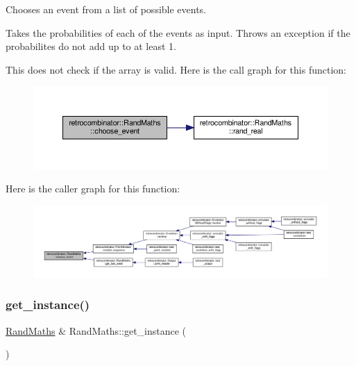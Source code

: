 Chooses an event from a list of possible events. 

Takes the probabilities of each of the events as input. Throws an exception if the probabilites do not add up to at least 1.

This does not check if the array is valid. Here is the call graph for this function\+:\nopagebreak
\begin{figure}[H]
\begin{center}
\leavevmode
\includegraphics[width=350pt]{classretrocombinator_1_1RandMaths_a3834f9a074546f0d588247610f16fb0e_cgraph}
\end{center}
\end{figure}
Here is the caller graph for this function\+:
\nopagebreak
\begin{figure}[H]
\begin{center}
\leavevmode
\includegraphics[width=350pt]{classretrocombinator_1_1RandMaths_a3834f9a074546f0d588247610f16fb0e_icgraph}
\end{center}
\end{figure}
\mbox{\label{classretrocombinator_1_1RandMaths_ae54dee1a16fb0e275e1624ccaa7dc87e}} 
\subsubsection{\texorpdfstring{get\+\_\+instance()}{get\_instance()}}
{\footnotesize\ttfamily \hyperlink{classretrocombinator_1_1RandMaths}{Rand\+Maths} \& Rand\+Maths\+::get\+\_\+instance (\begin{DoxyParamCaption}{ }\end{DoxyParamCaption})\hspace{0.3cm}{\ttfamily [static]}}



